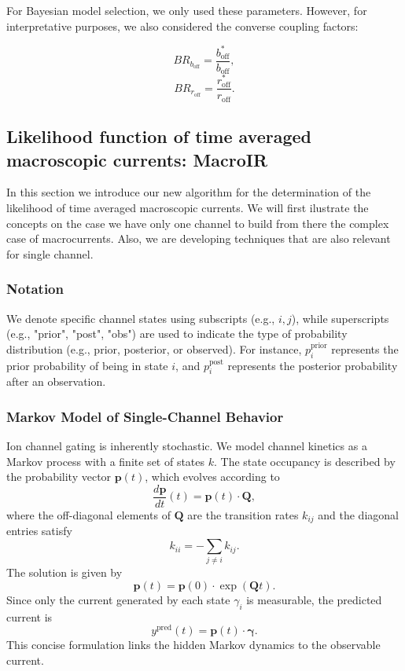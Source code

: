 \documentclass[pdflatex,sn-nature]{sn-jnl}%
\theoremstyle{thmstyleone}%
\theoremstyle{thmstyletwo}%
\theoremstyle{thmstylethree}%
\begin{document}
For Bayesian model selection, we only used these parameters. However, for interpretative purposes, we also considered the converse coupling factors:

\[
BR_{b_{\text{off}}} = \frac{b^*_{\text{off}}}{b_{\text{off}}},
\]
\[
BR_{r_{\text{off}}} = \frac{r^*_{\text{off}}}{r_{\text{off}}}.
\]

\subsection{Likelihood function of time averaged macroscopic currents: MacroIR}
In this section we introduce our new algorithm for the determination of the likelihood of time averaged macroscopic currents. We will first ilustrate the concepts on the case we have only one channel to build from there the complex case of macrocurrents. Also, we are developing techniques that are also relevant for single channel.   

\subsubsection{Notation}
We denote specific channel states using subscripts (e.g., \( i, j \)), while superscripts (e.g., "prior", "post", "obs") are used to indicate the type of probability distribution (e.g., prior, posterior, or observed). For instance, \( p_i^{\text{prior}} \) represents the prior probability of being in state \( i \), and \( p_i^{\text{post}} \) represents the posterior probability after an observation.

\subsubsection{Markov Model of Single-Channel Behavior}

Ion channel gating is inherently stochastic. We model channel kinetics as a Markov process with a finite set of states \(k\). The state occupancy is described by the probability vector \(\boldsymbol{p}(t)\), which evolves according to
\begin{equation}
	\frac{d\boldsymbol{p}}{dt}(t) = \boldsymbol{p}(t)\cdot \boldsymbol{Q},
	\label{eq:master_equation_short}
\end{equation}
where the off-diagonal elements of \(\boldsymbol{Q}\) are the transition rates \(k_{ij}\) and the diagonal entries satisfy
\begin{equation}
	k_{ii} = -\sum_{j\neq i} k_{ij}.
	\label{eq:Q_diag_short}
\end{equation}
The solution is given by
\begin{equation}
	\boldsymbol{p}(t) = \boldsymbol{p}(0) \cdot \exp(\boldsymbol{Q}t).
	\label{eq:master equation solution}
\end{equation}
Since only the current generated by each state \(\gamma_i\) is measurable, the predicted current is
\begin{equation}
	y^{\text{pred}}(t) = \boldsymbol{p}(t)\cdot \boldsymbol{\gamma}.
	\label{eq:current_pred_short}
\end{equation}
This concise formulation links the hidden Markov dynamics to the observable current.
\end{document}
